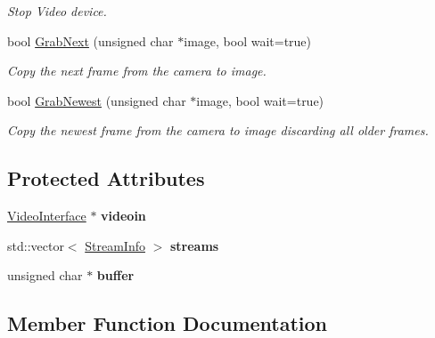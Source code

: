 \begin{DoxyCompactItemize}
\begin{DoxyCompactList}\small\item\em Stop Video device. \end{DoxyCompactList}\item 
bool \hyperlink{classpangolin_1_1_firewire_deinterlace_aaa81e0d6457be119a59cec2090da1412}{Grab\+Next} (unsigned char $\ast$image, bool wait=true)
\begin{DoxyCompactList}\small\item\em Copy the next frame from the camera to image. \end{DoxyCompactList}\item 
bool \hyperlink{classpangolin_1_1_firewire_deinterlace_ab819fe555e55255b96a727eb284ed2dc}{Grab\+Newest} (unsigned char $\ast$image, bool wait=true)
\begin{DoxyCompactList}\small\item\em Copy the newest frame from the camera to image discarding all older frames. \end{DoxyCompactList}\end{DoxyCompactItemize}
\subsection*{Protected Attributes}
\begin{DoxyCompactItemize}
\item 
\hyperlink{structpangolin_1_1_video_interface}{Video\+Interface} $\ast$ {\bfseries videoin}\hypertarget{classpangolin_1_1_firewire_deinterlace_a13682005b960077262c0d8031aa17dc1}{}\label{classpangolin_1_1_firewire_deinterlace_a13682005b960077262c0d8031aa17dc1}

\item 
std\+::vector$<$ \hyperlink{classpangolin_1_1_stream_info}{Stream\+Info} $>$ {\bfseries streams}\hypertarget{classpangolin_1_1_firewire_deinterlace_a1b26fb353dd5bef9c73e0c2ea746f9e9}{}\label{classpangolin_1_1_firewire_deinterlace_a1b26fb353dd5bef9c73e0c2ea746f9e9}

\item 
unsigned char $\ast$ {\bfseries buffer}\hypertarget{classpangolin_1_1_firewire_deinterlace_a3abdcf85ad82749086033d99a506a62c}{}\label{classpangolin_1_1_firewire_deinterlace_a3abdcf85ad82749086033d99a506a62c}

\end{DoxyCompactItemize}


\subsection{Member Function Documentation}
